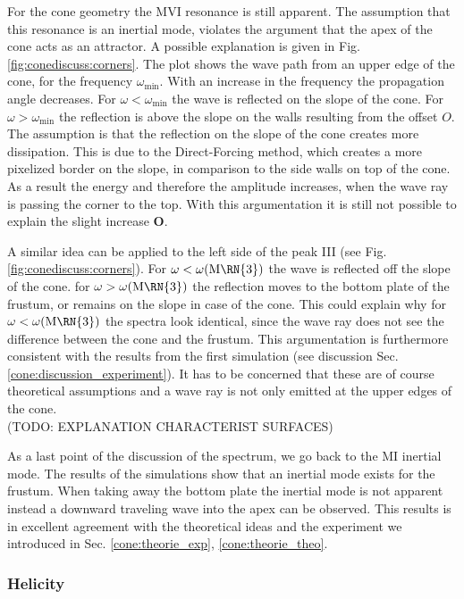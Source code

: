 
For the cone geometry the M\RN{6} resonance is still apparent.
The assumption that this resonance is an inertial mode,
violates the argument that the apex of the cone acts as
an attractor.
A possible explanation is given in Fig. \ref{fig:conediscuss:corners}.
The plot shows the wave path from an upper edge of the cone, for the frequency $\omega_{\text{min}}$.
With an increase in the frequency the propagation angle decreases.
For $\omega<\omega_{\text{min}}$ the wave is reflected on the slope of the cone.
For $\omega>\omega_{\text{min}}$ the reflection is above the slope on the walls resulting from the offset $O$.
The assumption is that the reflection on the slope of the cone creates more dissipation.
This is due to the Direct-Forcing method, which creates a more pixelized border on the slope,
in comparison to the side walls on top of the cone.
As a result the energy and therefore the amplitude increases,
when the wave ray is passing the corner to the top.
With this argumentation it is still not possible to explain the slight increase \textbf{O}.


A similar idea can be applied to the left side of the peak \RN{3} (see Fig. \ref{fig:conediscuss:corners}).
For $\omega<\omega(\text{M\RN{3}})$ the wave is reflected off the slope of the cone.
for  $\omega>\omega(\text{M\RN{3}})$ the reflection moves to the bottom plate of the frustum,
or remains on the slope in case of the cone.
This could explain why for   $\omega<\omega(\text{M\RN{3}})$  the spectra look identical,
since the wave ray does not see the difference between the cone and the frustum.
This argumentation is furthermore consistent with the results from the first simulation
(see discussion Sec. \ref{cone:discussion_experiment}).
It has to be concerned that these are of course theoretical assumptions and a wave ray is not only emitted at the
upper edges of the cone.\\ (TODO: EXPLANATION CHARACTERIST SURFACES)

As a last point of the discussion of the spectrum, we go back to the M\RN{1} inertial mode.
The results of the simulations show that an inertial mode exists for the frustum.
When taking away the bottom plate the inertial mode is not apparent instead
a downward traveling wave into the apex can be observed.
This results is in excellent agreement with the theoretical ideas and the experiment we introduced in Sec.
\ref{cone:theorie_exp}, \ref{cone:theorie_theo}.
\clearpage
\subsubsection{Helicity}

